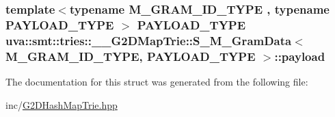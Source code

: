 \subsubsection[{payload}]{\setlength{\rightskip}{0pt plus 5cm}template$<$typename M\+\_\+\+G\+R\+A\+M\+\_\+\+I\+D\+\_\+\+T\+Y\+P\+E , typename P\+A\+Y\+L\+O\+A\+D\+\_\+\+T\+Y\+P\+E $>$ P\+A\+Y\+L\+O\+A\+D\+\_\+\+T\+Y\+P\+E {\bf uva\+::smt\+::tries\+::\+\_\+\+\_\+\+G2\+D\+Map\+Trie\+::\+S\+\_\+\+M\+\_\+\+Gram\+Data}$<$ M\+\_\+\+G\+R\+A\+M\+\_\+\+I\+D\+\_\+\+T\+Y\+P\+E, P\+A\+Y\+L\+O\+A\+D\+\_\+\+T\+Y\+P\+E $>$\+::payload}\label{structuva_1_1smt_1_1tries_1_1_____g2_d_map_trie_1_1_s___m___gram_data_a3dcc7bf22bca173a149dff6c1aac9ab1}


The documentation for this struct was generated from the following file\+:\begin{DoxyCompactItemize}
\item 
inc/\hyperlink{_g2_d_hash_map_trie_8hpp}{G2\+D\+Hash\+Map\+Trie.\+hpp}\end{DoxyCompactItemize}
